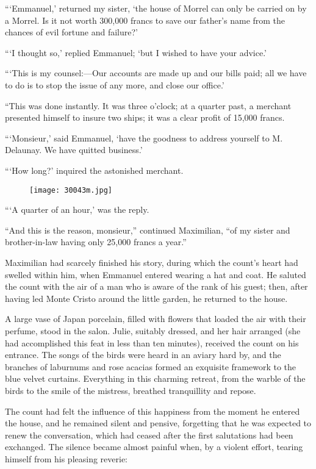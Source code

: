 “‘Emmanuel,’ returned my sister, ‘the house of Morrel can only be
carried on by a Morrel. Is it not worth 300,000 francs to save our
father’s name from the chances of evil fortune and failure?’

“‘I thought so,’ replied Emmanuel; ‘but I wished to have your advice.’

“‘This is my counsel:—Our accounts are made up and our bills paid; all
we have to do is to stop the issue of any more, and close our office.’

“This was done instantly. It was three o’clock; at a quarter past, a
merchant presented himself to insure two ships; it was a clear profit
of 15,000 francs.

“‘Monsieur,’ said Emmanuel, ‘have the goodness to address yourself to
M. Delaunay. We have quitted business.’

“‘How long?’ inquired the astonished merchant.

\begin{figure}[ht]
\texttt{[image: 30043m.jpg]}
\end{figure}

“‘A quarter of an hour,’ was the reply.

“And this is the reason, monsieur,” continued Maximilian, “of my sister
and brother-in-law having only 25,000 francs a year.”

Maximilian had scarcely finished his story, during which the count’s
heart had swelled within him, when Emmanuel entered wearing a hat and
coat. He saluted the count with the air of a man who is aware of the
rank of his guest; then, after having led Monte Cristo around the
little garden, he returned to the house.

A large vase of Japan porcelain, filled with flowers that loaded the
air with their perfume, stood in the salon. Julie, suitably dressed,
and her hair arranged (she had accomplished this feat in less than ten
minutes), received the count on his entrance. The songs of the birds
were heard in an aviary hard by, and the branches of laburnums and rose
acacias formed an exquisite framework to the blue velvet curtains.
Everything in this charming retreat, from the warble of the birds to
the smile of the mistress, breathed tranquillity and repose.

The count had felt the influence of this happiness from the moment he
entered the house, and he remained silent and pensive, forgetting that
he was expected to renew the conversation, which had ceased after the
first salutations had been exchanged. The silence became almost painful
when, by a violent effort, tearing himself from his pleasing reverie:

